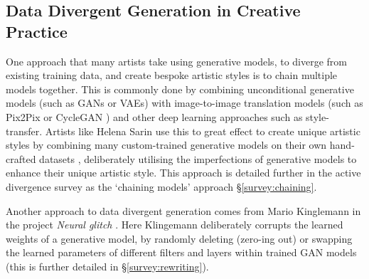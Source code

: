 \subsection{Data Divergent Generation in Creative Practice}
\label{c2:subsec:divergent-practice}

One approach that many artists take using generative models, to diverge from existing training data, and create bespoke artistic styles is to chain multiple models together. 
This is commonly done by combining unconditional generative models (such as GANs or VAEs) with image-to-image translation models (such as Pix2Pix \citep{isola2017image} or CycleGAN \citep{zhu2017unpaired}) and other deep learning approaches such as style-transfer.
Artists like Helena Sarin use this to great effect to create unique artistic styles by combining many custom-trained generative models on their own hand-crafted datasets \citep{sarin2018playing}, deliberately utilising the imperfections of generative models to enhance their unique artistic style. 
This approach is detailed further in the active divergence survey as the `chaining models' approach \S \ref{survey:chaining}.

Another approach to data divergent generation comes from Mario Kinglemann in the project \textit{Neural glitch} \citep{klingemann2018neural}. 
Here Klingemann deliberately corrupts the learned weights of a generative model, by randomly deleting (zero-ing out) or swapping the learned parameters of different filters and layers within trained GAN models (this is further detailed in \S \ref{survey:rewriting}). 

